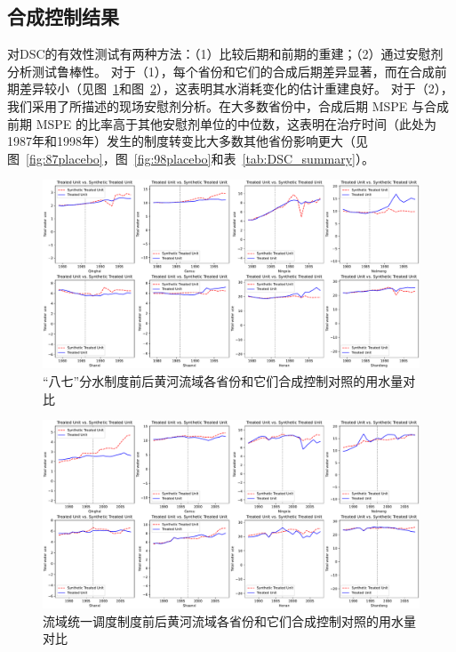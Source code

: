 \subsection{合成控制结果}

对DSC的有效性测试有两种方法：（1）比较后期和前期的重建；（2）通过安慰剂分析测试鲁棒性。
对于（1），每个省份和它们的合成后期差异显著，而在合成前期差异较小（见图~\ref{fig:87panel}和图~\ref{fig:98panel}），这表明其水消耗变化的估计重建良好。
对于（2），我们采用了\cite{abadie2010}所描述的现场安慰剂分析。在大多数省份中，合成后期 MSPE 与合成前期 MSPE 的比率高于其他安慰剂单位的中位数，这表明在治疗时间（此处为1987年和1998年）发生的制度转变比大多数其他省份影响更大（见图~\ref{fig:87placebo}，图~\ref{fig:98placebo}和表~\ref{tab:DSC_summary}）。




\begin{figure}[!bh]
    \includegraphics[width=0.9\linewidth]{img/ch5/87panel.pdf}
    \centering
    \caption[“八七”分水制度前后的合成控制对照]{“八七”分水制度前后黄河流域各省份和它们合成控制对照的用水量对比}\label{fig:87panel}
\end{figure}

\begin{figure}
    \includegraphics[width=0.9\linewidth]{img/ch5/98panel.pdf}
    \centering
    \caption[流域统一调度制度前后的合成控制对照]{流域统一调度制度前后黄河流域各省份和它们合成控制对照的用水量对比}\label{fig:98panel}
\end{figure}


